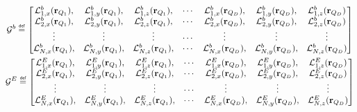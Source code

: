 \begin{gather}
    \mathcal{G}^b \defeq
    \begin{bmatrix}
        \mathcal{L}_{1,x}^b(\mathbf{r}_{Q_1}), & \mathcal{L}_{1,y}^b(\mathbf{r}_{Q_1}), & \mathcal{L}_{1,z}^b(\mathbf{r}_{Q_1}), &
        \cdots &
        \mathcal{L}_{1,x}^b(\mathbf{r}_{Q_D}), & \mathcal{L}_{1,y}^b(\mathbf{r}_{Q_D}), & \mathcal{L}_{1,z}^b(\mathbf{r}_{Q_D}) \\
        \mathcal{L}_{2,x}^b(\mathbf{r}_{Q_1}), & \mathcal{L}_{2,y}^b(\mathbf{r}_{Q_1}), & \mathcal{L}_{2,z}^b(\mathbf{r}_{Q_1}), &
        \cdots &
        \mathcal{L}_{2,x}^b(\mathbf{r}_{Q_D}), & \mathcal{L}_{2,y}^b(\mathbf{r}_{Q_D}), & \mathcal{L}_{2,z}^b(\mathbf{r}_{Q_D}) \\
        \vdots                                 & \vdots                                 & \vdots                                 &
        \cdots &
        \vdots                                 &  \vdots                                & \vdots                                \\
        \mathcal{L}_{N,x}^b(\mathbf{r}_{Q_1}), & \mathcal{L}_{N,y}^b(\mathbf{r}_{Q_1}), & \mathcal{L}_{N,z}^b(\mathbf{r}_{Q_1}), &
        \cdots &
        \mathcal{L}_{N,x}^b(\mathbf{r}_{Q_D}), & \mathcal{L}_{N,y}^b(\mathbf{r}_{Q_D}), & \mathcal{L}_{N,z}^b(\mathbf{r}_{Q_D})
    \end{bmatrix}\\
    \mathcal{G}^E \defeq
    \begin{bmatrix}
        \mathcal{L}_{1,x}^E(\mathbf{r}_{Q_1}), & \mathcal{L}_{1,y}^E(\mathbf{r}_{Q_1}), & \mathcal{L}_{1,z}^E(\mathbf{r}_{Q_1}), &
        \cdots &
        \mathcal{L}_{1,x}^E(\mathbf{r}_{Q_D}), & \mathcal{L}_{1,y}^E(\mathbf{r}_{Q_D}), & \mathcal{L}_{1,z}^E(\mathbf{r}_{Q_D}) \\
        \mathcal{L}_{2,x}^E(\mathbf{r}_{Q_1}), & \mathcal{L}_{2,y}^E(\mathbf{r}_{Q_1}), & \mathcal{L}_{2,z}^E(\mathbf{r}_{Q_1}), &
        \cdots &
        \mathcal{L}_{2,x}^E(\mathbf{r}_{Q_D}), & \mathcal{L}_{2,y}^E(\mathbf{r}_{Q_D}), & \mathcal{L}_{2,z}^E(\mathbf{r}_{Q_D}) \\
        \vdots                                 & \vdots                                 & \vdots                                 &
        \cdots &
        \vdots                                 &  \vdots                                & \vdots                                \\
        \mathcal{L}_{N,x}^E(\mathbf{r}_{Q_1}), & \mathcal{L}_{N,y}^E(\mathbf{r}_{Q_1}), & \mathcal{L}_{N,z}^E(\mathbf{r}_{Q_1}), &
        \cdots &
        \mathcal{L}_{N,x}^E(\mathbf{r}_{Q_D}), & \mathcal{L}_{N,y}^E(\mathbf{r}_{Q_D}), & \mathcal{L}_{N,z}^E(\mathbf{r}_{Q_D})
    \end{bmatrix}
\end{gather}

